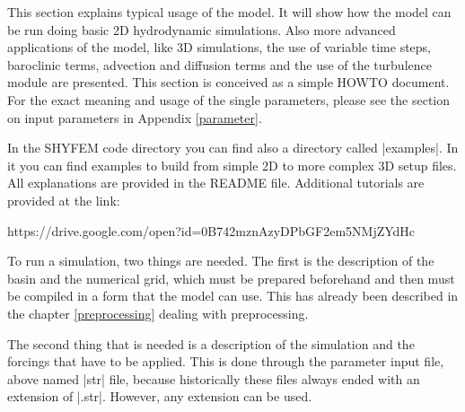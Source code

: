 
%
%
%
%
%
%
%

This section explains typical usage of the model. It will show how
the model can be run doing basic 2D hydrodynamic simulations. Also 
more advanced applications of the model, like 3D simulations, the use of variable time steps,
baroclinic terms, advection and diffusion terms and the
use of the turbulence module are presented. This section is
conceived as a simple HOWTO document. For the exact meaning and usage
of the single parameters, please see the section on input parameters in Appendix \ref{parameter}.

In the SHYFEM code directory you can find also a directory called |examples|.  In it you can find examples
 to build from simple 2D to more complex 3D setup files. All explanations are 
provided in the README file. Additional tutorials are provided at the
link:

https://drive.google.com/open?id=0B742mznAzyDPbGF2em5NMjZYdHc


To run a simulation, two things are needed. The first is the description
of the basin and the numerical grid, which must be prepared beforehand and
then must be compiled in a form that the model can use. This has already been
 described in the chapter \ref{preprocessing} dealing with preprocessing.

The second thing that is needed is a description of the simulation and the
forcings that have to be applied. This is done through the parameter input
file, above named |str| file, because historically these files always
ended with an extension of |.str|. However, any extension can be used.

